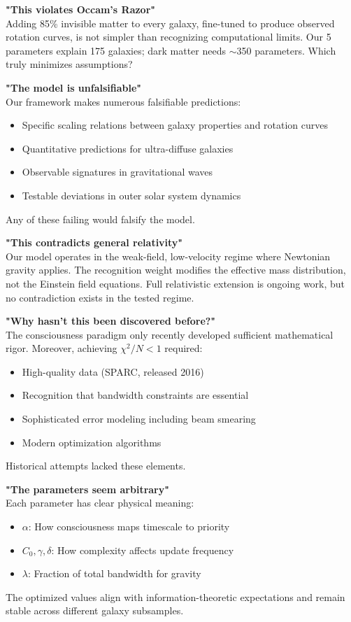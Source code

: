 \documentclass[twocolumn,prd,amsmath,amssymb,aps,superscriptaddress,nofootinbib]{revtex4-2}
\newcommand{\chisqN}{\chi^2/N}
\begin{document}
\textbf{"This violates Occam's Razor"}\\
Adding 85\% invisible matter to every galaxy, fine-tuned to produce observed rotation curves, is not simpler than recognizing computational limits. Our 5 parameters explain 175 galaxies; dark matter needs $\sim$350 parameters. Which truly minimizes assumptions?

\textbf{"The model is unfalsifiable"}\\
Our framework makes numerous falsifiable predictions:
\begin{itemize}
\item Specific scaling relations between galaxy properties and rotation curves
\item Quantitative predictions for ultra-diffuse galaxies
\item Observable signatures in gravitational waves
\item Testable deviations in outer solar system dynamics
\end{itemize}
Any of these failing would falsify the model.

\textbf{"This contradicts general relativity"}\\
Our model operates in the weak-field, low-velocity regime where Newtonian gravity applies. The recognition weight modifies the effective mass distribution, not the Einstein field equations. Full relativistic extension is ongoing work, but no contradiction exists in the tested regime.

\textbf{"Why hasn't this been discovered before?"}\\
The consciousness paradigm only recently developed sufficient mathematical rigor. Moreover, achieving $\chisqN < 1$ required:
\begin{itemize}
\item High-quality data (SPARC, released 2016)
\item Recognition that bandwidth constraints are essential
\item Sophisticated error modeling including beam smearing
\item Modern optimization algorithms
\end{itemize}
Historical attempts lacked these elements.

\textbf{"The parameters seem arbitrary"}\\
Each parameter has clear physical meaning:
\begin{itemize}
\item $\alpha$: How consciousness maps timescale to priority
\item $C_0, \gamma, \delta$: How complexity affects update frequency  
\item $\lambda$: Fraction of total bandwidth for gravity
\end{itemize}
The optimized values align with information-theoretic expectations and remain stable across different galaxy subsamples.
\end{document}
